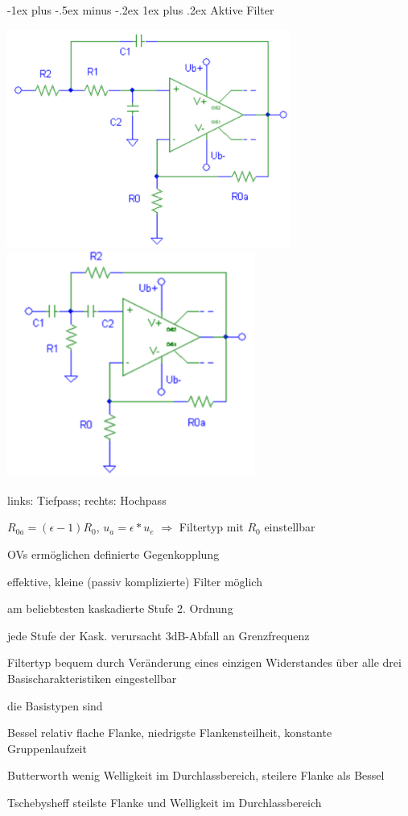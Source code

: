 \documentclass[a4paper]{article}
\makeatletter
\renewcommand{\subsubsection}{\@startsection{subsubsection}{3}{0mm}%
 {-1ex plus -.5ex minus -.2ex}%
 {1ex plus .2ex}%
 {\normalfont\small\bfseries}}
\makeatother
\begin{document}
\begin{multicols}{3}
  \subsubsection{Aktive Filter}\label{aktive-filter}
  \begin{center}
    \includegraphics[width=.3\linewidth]{Assets/Biosignalverarbeitung-tiefpass-2.ordnung.png}
    \includegraphics[width=.3\linewidth]{Assets/Biosignalverarbeitung-hochpass-2.ordnung.png}
  \end{center}
  \begin{itemize*}
    \item links: Tiefpass; rechts: Hochpass
    \item $R_{0a}=(\epsilon-1)R_0$, $u_a=\epsilon*u_e$ $\Rightarrow$ Filtertyp mit $R_0$ einstellbar
    \item OVs ermöglichen definierte Gegenkopplung
    \item effektive, kleine (passiv komplizierte) Filter möglich
    \item am beliebtesten kaskadierte Stufe 2. Ordnung
    \item jede Stufe der Kask. verursacht 3dB-Abfall an Grenzfrequenz
    \item Filtertyp bequem durch Veränderung eines einzigen Widerstandes über alle drei Basischarakteristiken eingestellbar
    \item die Basistypen sind
  \end{itemize*}
  \begin{description*}
    \item[Bessel] relativ flache Flanke, niedrigste Flankensteilheit, konstante Gruppenlaufzeit
    \item[Butterworth] wenig Welligkeit im Durchlassbereich, steilere Flanke als Bessel
    \item[Tschebysheff] steilste Flanke und Welligkeit im Durchlassbereich

\end{description*}
\end{multicols}
\end{document}
